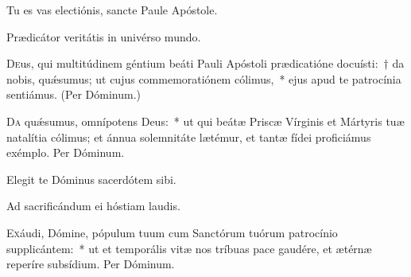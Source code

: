 \documentclass[vesperale_romanum.tex]{subfiles}
\begin{document}

\vv Tu es vas electiónis, sancte Paule Apóstole.

\rr Prædicátor veritátis in univérso mundo.
\label{oratio_s_pauli}
\oratio

\lettrine{D}{e}us, qui multitúdinem géntium beáti Pauli Apóstoli prædicatióne docuísti:~† da nobis, quǽsumus; ut cujus commemoratiónem cólimus,~* ejus apud te patrocínia sentiámus. (Per Dóminum.)



\oratio

\lettrine{D}{a} quǽsumus, omnípotens Deus:~* ut qui beátæ Priscæ Vírginis et Mártyris tuæ natalítia cólimus; et ánnua sole\-mnitáte lætémur, et tantæ fídei proficiámus exémplo.
Per Dóminum.


 

\vv Elegit te Dóminus sacerdótem sibi.

\rr Ad sacrificándum ei hóstiam laudis.



\myrule


\simplex


\oratio

\lettrine{E}{x}áudi, Dómine, pópulum tuum cum Sanctórum tuórum patrocínio supplicántem:~* ut et temporális vitæ nos tríbuas pace gaudére, et ætérnæ reperíre subsídium.
Per Dóminum.
\end{document}
